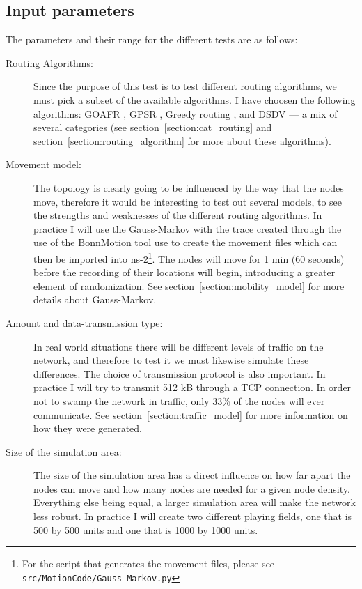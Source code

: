 \subsection{Input parameters}
\label{section:input_parameters}
The parameters and their range for the different tests are as follows:
\begin{description}
\item[Routing Algorithms:] Since the purpose of this test is to test different routing algorithms, we must pick a subset of the available algorithms. I have choosen the following algorithms: GOAFR \cite{gopher}, GPSR \cite{gpsr}, Greedy routing \cite{gopher}, and DSDV \cite{DSDV} --- a mix of several categories (see section~\ref{section:cat_routing} and section~\ref{section:routing_algorithm} for more about these algorithms).

\item[Movement model:] The topology is clearly going to be influenced by the way that the nodes move, therefore it would be interesting to test out several models, to see the strengths and weaknesses of the different routing algorithms. In practice I will use  the Gauss-Markov \cite{MobilityAdHocResearch} with the trace created through the use of the BonnMotion tool \cite{toilers} use to create the movement files which can then be imported into ns-2\footnote{For the script that generates the movement files, please see \texttt{src/MotionCode/Gauss-Markov.py}}. The nodes will move for 1 min (60 seconds) before the recording of their locations will begin, introducing a greater element of randomization. See section~\ref{section:mobility_model} for more details about Gauss-Markov.

\item[Amount and data-transmission type:] In real world situations there will be different levels of traffic on the network, and therefore to test it we must likewise simulate these differences. The choice of transmission protocol is also important. In practice I will try to transmit 512 kB through a TCP connection. In order not to swamp the network in traffic, only 33\% of the nodes will ever communicate. See section~\ref{section:traffic_model} for more information on how they were generated.

\item[Size of the simulation area:] The size of the simulation area has a direct influence on how far apart the nodes can move and how many nodes are needed for a given node density. Everything else being equal, a larger simulation area will make the network less robust. In practice I will create two different playing fields, one that is 500 by 500 units and one that is 1000 by 1000 units.


\end{description}

